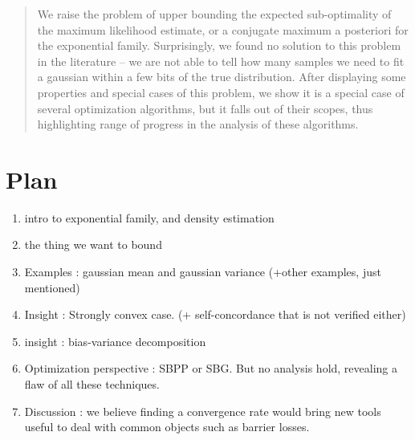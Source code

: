 \documentclass[twoside]{article}
\begin{document}
%

%


\begin{abstract}
We raise the problem of upper bounding the expected sub-optimality of the maximum likelihood estimate, or a conjugate maximum a posteriori for the exponential family. 
Surprisingly, we found no solution to this problem in the literature -- we are not able to tell how many samples we need to fit a gaussian within a few bits of the true distribution.
After displaying some properties and special cases of this problem, 
we show it is a special case of several optimization algorithms, but it falls out of their scopes, thus highlighting range of progress in the analysis of these algorithms.
\end{abstract}

\section{Plan}

\begin{enumerate}
	\item intro to exponential family, and density estimation
	\item the thing we want to bound
	\item Examples : gaussian mean and gaussian variance (+other examples, just mentioned)
	\item Insight : Strongly convex case. (+ self-concordance that is not verified either)
	\item insight : bias-variance decomposition
	\item Optimization perspective : SBPP or SBG. But no analysis hold, revealing a flaw of all these techniques.
	\item Discussion : we believe finding a convergence rate would bring new tools useful to deal with common objects such as barrier losses.
\end{enumerate}
\end{document}
